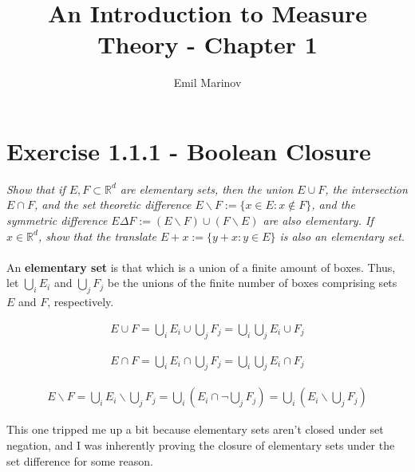 \documentclass[12pt,letterpaper]{article}
\begin{document}
\title{An Introduction to Measure Theory - Chapter 1}
\author{Emil Marinov}
\maketitle

\section{Exercise 1.1.1 - Boolean Closure}

\textit{Show that if $E, F \subset \mathbb{R}^d$ are elementary sets, then the union $E \cup F$, 
the intersection $E \cap F$, and the
set theoretic difference $E \backslash F := \{x \in E : x \notin F\}$, and the symmetric
difference $E \Delta F := (E \backslash F) \cup (F \backslash E)$ are also elementary. If $x \in \mathbb{R}^d$, 
show that the translate $E + x := \{y+x : y \in E\}$ is also an elementary
set.}
\\
\\
An \textbf{elementary set} is that which is a union of a finite amount of boxes.  Thus, let
$\bigcup_i E_i$ and $\bigcup_j F_j$ be the unions of the finite number of boxes comprising sets $E$ and $F$, respectively.

\begin{equation}
   \begin{aligned}
        E \cup F = \bigcup_i E_i \cup \bigcup_j F_j
        = \bigcup_i \bigcup_j E_i \cup F_j
   \end{aligned}
\end{equation}

\begin{equation}
   \begin{aligned}
      E \cap F = \bigcup_i E_i \cap \bigcup_j F_j
      = \bigcup_i \bigcup_j E_i \cap F_j
   \end{aligned}
\end{equation}

\begin{equation}
   \begin{aligned}
      E \backslash F = \bigcup_i E_i \backslash \bigcup_j F_j 
      = \bigcup_i \left( E_i \cap \neg \bigcup_j F_j \right)
      = \bigcup_i \left( E_i \backslash \bigcup_j F_j \right)
   \end{aligned}
\end{equation}

This one tripped me up a bit because elementary sets aren't closed under set negation,
and I was inherently proving the closure of elementary sets under the set difference for some reason.
\end{document}
